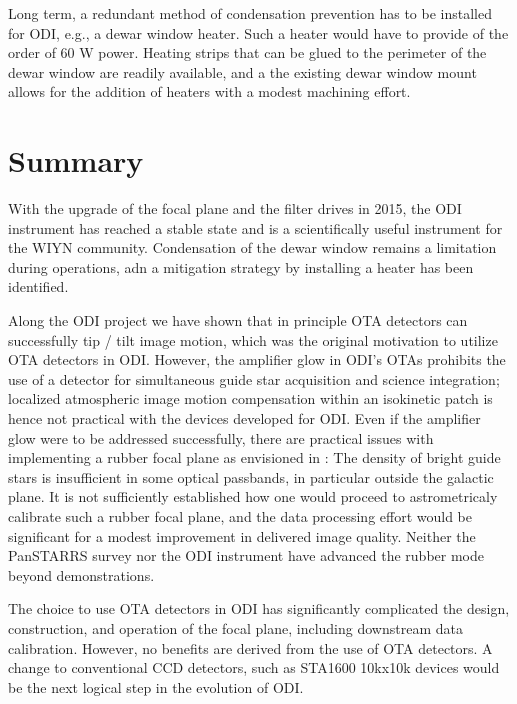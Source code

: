 \documentclass[]{spieman}
\begin{document}
Long term, a redundant method of condensation prevention has to be installed for
ODI, e.g., a dewar window heater. Such a heater would have to provide of the
order of 60 W power. Heating strips that can be glued to the perimeter of the
dewar window are readily available, and a the existing dewar window mount allows
for the addition of heaters with a modest machining effort.


\section{Summary}

With the upgrade of the focal plane and the filter drives in 2015, the ODI
instrument has reached a stable state and is a scientifically useful instrument
for the WIYN community. Condensation of the dewar window remains a limitation
during  operations, adn a mitigation strategy by installing a heater has been
identified.

Along the ODI project we have shown that in principle OTA detectors can
successfully tip / tilt image motion, which was the original motivation to 
utilize OTA detectors in ODI.  However, the amplifier glow in ODI's OTAs
prohibits the use of a detector for simultaneous guide star acquisition and
science integration; localized atmospheric image motion compensation within an
isokinetic patch is hence not practical with the devices developed for ODI. Even
if the amplifier glow were to be addressed successfully, there are practical
issues with implementing a rubber focal plane as envisioned in \cite{tonry2002}:
The density of  bright guide stars is insufficient in some  optical passbands,
in particular outside the galactic plane. It is not sufficiently established how
one would proceed to astrometricaly calibrate such a rubber focal plane, and the
data processing effort would be significant for a modest improvement in
delivered image quality. Neither the PanSTARRS survey nor the ODI
instrument have advanced the rubber mode beyond demonstrations.

The choice to use  OTA detectors in ODI has significantly complicated the
design, construction, and operation of the focal plane, including downstream
data calibration. However, no benefits are derived from the use of OTA
detectors.   A change to conventional CCD detectors, such as STA1600 10kx10k
devices would be the next logical step in the evolution of ODI.

 

\end{document}
